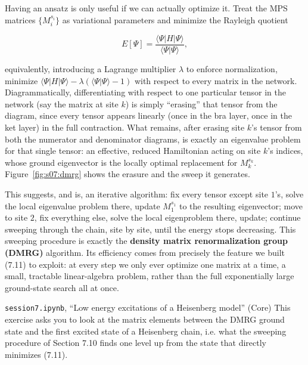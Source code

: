 Having an ansatz is only useful if we can actually optimize it. Treat the MPS matrices $\{M_i^{s_i}\}$
as variational parameters and minimize the Rayleigh quotient

\begin{equation}
E[\Psi] = \frac{\langle \Psi | H | \Psi \rangle}{\langle \Psi | \Psi \rangle},
\end{equation}

equivalently, introducing a Lagrange multiplier $\lambda$ to enforce normalization, minimize $\langle
\Psi|H|\Psi\rangle - \lambda\left(\langle\Psi|\Psi\rangle - 1\right)$ with respect to every matrix in
the network. Diagrammatically, differentiating with respect to one particular tensor in the network
(say the matrix at site $k$) is simply ``erasing'' that tensor from the diagram, since every tensor
appears linearly (once in the bra layer, once in the ket layer) in the full contraction. What remains,
after erasing site $k$'s tensor from both the numerator and denominator diagrams, is exactly an
eigenvalue problem for that single tensor: an effective, reduced Hamiltonian acting on site $k$'s
indices, whose ground eigenvector is the locally optimal replacement for $M_k^{s_k}$.
Figure~\ref{fig:s07:dmrg} shows the erasure and the sweep it generates.



This suggests, and is, an iterative algorithm: fix every tensor except site $1$'s, solve the local
eigenvalue problem there, update $M_1^{s_1}$ to the resulting eigenvector; move to site $2$, fix
everything else, solve the local eigenproblem there, update; continue sweeping through the chain, site
by site, until the energy stops decreasing. This sweeping procedure is exactly the \textbf{density matrix
renormalization group (DMRG)} algorithm. Its efficiency comes from precisely the feature we built
(7.11) to exploit: at every step we only ever optimize one matrix at a time, a small, tractable
linear-algebra problem, rather than the full exponentially large ground-state search all at once.

\begin{notebookbox}{\texttt{session7.ipynb}, ``Low energy excitations of a Heisenberg model'' (Core)}
This exercise asks you to look at the matrix elements between the DMRG ground state and the first
excited state of a Heisenberg chain, i.e. what the sweeping procedure of Section 7.10 finds one level
up from the state that directly minimizes (7.11).
\end{notebookbox}

